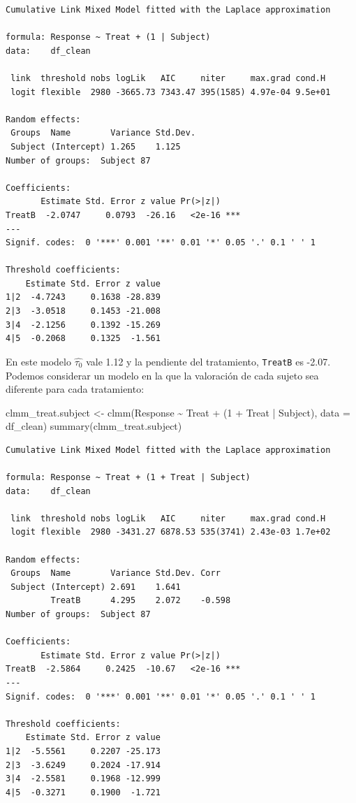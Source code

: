 \documentclass[
  12pt,
  a4paper,
  extrafontsizes,
  onecolumn,
  openright]{memoir}
\newenvironment{Shaded}{\begin{snugshade}}{\end{snugshade}}
\newcommand{\AttributeTok}[1]{\textcolor[rgb]{0.40,0.45,0.13}{#1}}
\newcommand{\DecValTok}[1]{\textcolor[rgb]{0.68,0.00,0.00}{#1}}
\newcommand{\FunctionTok}[1]{\textcolor[rgb]{0.28,0.35,0.67}{#1}}
\newcommand{\NormalTok}[1]{\textcolor[rgb]{0.00,0.23,0.31}{#1}}
\newcommand{\OtherTok}[1]{\textcolor[rgb]{0.00,0.23,0.31}{#1}}
\newcommand{\SpecialCharTok}[1]{\textcolor[rgb]{0.37,0.37,0.37}{#1}}
\begin{document}
\begin{verbatim}
Cumulative Link Mixed Model fitted with the Laplace approximation

formula: Response ~ Treat + (1 | Subject)
data:    df_clean

 link  threshold nobs logLik   AIC     niter     max.grad cond.H 
 logit flexible  2980 -3665.73 7343.47 395(1585) 4.97e-04 9.5e+01

Random effects:
 Groups  Name        Variance Std.Dev.
 Subject (Intercept) 1.265    1.125   
Number of groups:  Subject 87 

Coefficients:
       Estimate Std. Error z value Pr(>|z|)    
TreatB  -2.0747     0.0793  -26.16   <2e-16 ***
---
Signif. codes:  0 '***' 0.001 '**' 0.01 '*' 0.05 '.' 0.1 ' ' 1

Threshold coefficients:
    Estimate Std. Error z value
1|2  -4.7243     0.1638 -28.839
2|3  -3.0518     0.1453 -21.008
3|4  -2.1256     0.1392 -15.269
4|5  -0.2068     0.1325  -1.561
\end{verbatim}

\normalsize

En este modelo \(\widehat{\tau_0}\) vale 1.12 y la pendiente del
tratamiento, \texttt{TreatB} es -2.07. Podemos considerar un modelo en
la que la valoración de cada sujeto sea diferente para cada tratamiento:

\scriptsize

\begin{Shaded}
\begin{Highlighting}[]
\NormalTok{clmm\_treat.subject }\OtherTok{\textless{}{-}} \FunctionTok{clmm}\NormalTok{(Response }\SpecialCharTok{\textasciitilde{}}\NormalTok{ Treat }\SpecialCharTok{+}\NormalTok{ (}\DecValTok{1} \SpecialCharTok{+}\NormalTok{ Treat }\SpecialCharTok{|}\NormalTok{ Subject), }\AttributeTok{data =}\NormalTok{ df\_clean)}
\FunctionTok{summary}\NormalTok{(clmm\_treat.subject)}
\end{Highlighting}
\end{Shaded}

\begin{verbatim}
Cumulative Link Mixed Model fitted with the Laplace approximation

formula: Response ~ Treat + (1 + Treat | Subject)
data:    df_clean

 link  threshold nobs logLik   AIC     niter     max.grad cond.H 
 logit flexible  2980 -3431.27 6878.53 535(3741) 2.43e-03 1.7e+02

Random effects:
 Groups  Name        Variance Std.Dev. Corr   
 Subject (Intercept) 2.691    1.641           
         TreatB      4.295    2.072    -0.598 
Number of groups:  Subject 87 

Coefficients:
       Estimate Std. Error z value Pr(>|z|)    
TreatB  -2.5864     0.2425  -10.67   <2e-16 ***
---
Signif. codes:  0 '***' 0.001 '**' 0.01 '*' 0.05 '.' 0.1 ' ' 1

Threshold coefficients:
    Estimate Std. Error z value
1|2  -5.5561     0.2207 -25.173
2|3  -3.6249     0.2024 -17.914
3|4  -2.5581     0.1968 -12.999
4|5  -0.3271     0.1900  -1.721
\end{verbatim}
\end{document}

